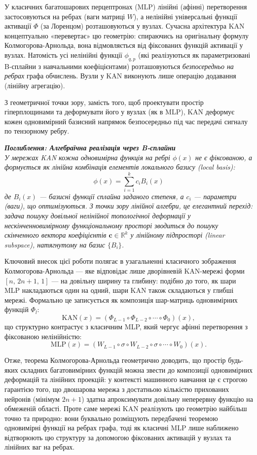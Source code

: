 \documentclass[12pt,a4paper]{article}
\renewenvironment{leftbar}{%
	\def\FrameCommand{\vrule width 1pt \hspace{10pt}}%
	\MakeFramed {\advance\hsize-\width \FrameRestore}}%
{\endMakeFramed}
\begin{document}
	У класичних багатошарових перцептронах (MLP) лінійні (афінні) перетворення застосовуються на ребрах (ваги матриці $W$), а нелінійні універсальні функції активації $\Phi$ (за Лоренцом) розташовуються у вузлах. Сучасна архітектура KAN концептуально «перевертає» цю геометрію: спираючись на оригінальну формулу Колмогорова-Арнольда, вона відмовляється від фіксованих функцій активації у вузлах. Натомість усі нелінійні функції $\phi_{q,p}$ (які реалізуються як параметризовані B-сплайни з навчальними коефіцієнтами) розташовуються \textit{безпосередньо на ребрах} графа обчислень. Вузли у KAN виконують лише операцію додавання (лінійну агрегацію).
	
	З геометричної точки зору, замість того, щоб проектувати простір гіперплощинами та деформувати його у вузлах (як в MLP), KAN деформує кожен одновимірний базисний напрямок безпосередньо під час передачі сигналу по тензорному ребру.
	
	\begin{leftbar}
		\itshape
		\textbf{Поглиблення: Алгебраїчна реалізація через B-сплайни} \\
		У мережах KAN кожна одновимірна функція на ребрі $\phi(x)$ не є фіксованою, а формується як лінійна комбінація елементів локального базису (\textit{local basis}):
		$$\phi(x) = \sum_{i=1}^k c_i B_i(x)$$
		де $B_i(x)$ — базисні функції сплайна заданого степеня, а $c_i$ — параметри (ваги), що оптимізуються. З точки зору лінійної алгебри, це елегантний перехід: задача пошуку довільної нелінійної топологічної деформації у нескінченновимірному функціональному просторі зводиться до пошуку скінченного вектора коефіцієнтів $\mathbf{c} \in \mathbb{R}^k$ у лінійному підпросторі (\textit{linear subspace}), натягнутому на базис $\{B_i\}$.
	\end{leftbar}
	
	Ключовий внесок цієї роботи полягає в узагальненні класичного зображення Колмогорова-Арнольда — яке відповідає лише дворівневій KAN-мережі форми $[n,\,2n+1,\,1]$ — на довільну ширину та глибину: подібно до того, як шари MLP накладаються один на одний, шари KAN також складаються у глибші мережі. Формально це записується як композиція шар-матриць одновимірних функцій $\Phi_l$:
	$$\text{KAN}(x) = (\Phi_{L-1} \circ \Phi_{L-2} \circ \cdots \circ \Phi_0)(x),$$
	що структурно контрастує з класичним MLP, який чергує афінні перетворення з фіксованою нелінійністю:
	$$\text{MLP}(x) = (W_{L-1} \circ \sigma \circ W_{L-2} \circ \sigma \circ \cdots \circ W_0)(x).$$
	
	Отже, теорема Колмогорова-Арнольда геометрично доводить, що простір будь-яких складних багатовимірних функцій можна звести до композиції одновимірних деформацій та лінійних проекцій: у контексті машинного навчання це є строгою гарантією того, що двошарова мережа з достатньою кількістю прихованих нейронів (мінімум $2n+1$) здатна апроксимувати довільну неперервну функцію на обмеженій області. Проте саме мережі KAN реалізують цю геометрію найбільш точно та природно: вони буквально розміщують передбачені теоремою одновимірні функції на ребрах графа, тоді як класичні MLP лише наближено відтворюють цю структуру за допомогою фіксованих активацій у вузлах та лінійних ваг на ребрах.
	
\end{document}
